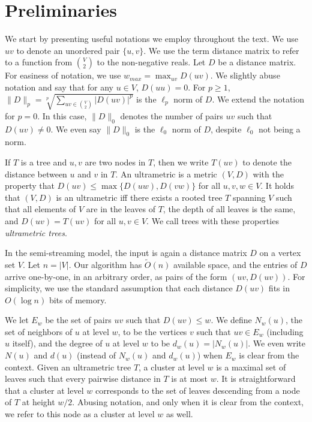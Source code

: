 \documentclass{article}
\newcommand{\set}[1]{\{#1\}}
\begin{document}
\newcommand{\clusters}{\mathcal{C}}
\newcommand{\inputmatrix}{D}

\section{Preliminaries}
We start by presenting useful notations we employ throughout the text.
We use $uv$ to denote an unordered pair $\set{u,v}$.
We use the term distance matrix to refer to a function from $\binom{V}{2}$ to the non-negative reals.
Let $D$ be a distance matrix.
For easiness of notation, we use $w_{max} = \max_{uv}{D(uv)}$.
We slightly abuse notation and say that for any $u\in V$, $D(uu)=0$.
For $p \ge 1$, $\|D\|_p = \sqrt[p]{\sum_{uv \in \binom{V}{2}}|D(uv)|^p}$ is the $\ell_p$ norm of $D$.
We extend the notation for $p=0$.
In this case, $\|D\|_0$ denotes the number of pairs $uv$ such that $D(uv)\ne 0$.
We even say $\|D\|_0$ is the $\ell_0$ norm of $D$, despite $\ell_0$ not being a norm.

If $T$ is a tree and $u,v$ are two nodes in $T$, then we write $T(uv)$ to denote the distance between $u$ and $v$ in $T$.
An ultrametric is a metric $(V,D)$ with the property that $D(uv) \le \max\set{D(uw),D(vw)}$ for all $u,v,w\in V$.
It holds that $(V,D)$ is an ultrametric iff there exists a rooted tree $T$ spanning $V$ such that all elements of $V$ are in the leaves of $T$, the depth of all leaves is the same, and $D(uv)=T(uv)$ for all $u,v\in V$.
We call trees with these properties \emph{ultrametric trees}.

In the semi-streaming model, the input is again a distance matrix $D$ on a vertex set $V$.
Let $n=|V|$.
Our algorithm has $\widetilde{O}(n)$ available space, and the entries of $D$ arrive one-by-one, in an arbitrary order, as pairs of the form $(uv,D(uv))$.
For simplicity, we use the standard assumption that each distance $D(uv)$ fits in $O(\log{n})$ bits of memory.

We let $E_w$ be the set of pairs $uv$ such that $D(uv) \le w$. 
We define $N_w(u)$, the set of neighbors of $u$ at level $w$, to be the vertices $v$ such that $uv \in E_w$ (including $u$ itself), and the degree of $u$ at level $w$ to be $d_w(u) = |N_w(u)|$.
We even write $N(u)$ and $d(u)$ (instead of $N_w(u)$ and $d_w(u)$) when $E_w$ is clear from the context.
Given an ultrametric tree $T$, a cluster at level $w$ is a maximal set of leaves such that every pairwise distance in $T$ is at most $w$.
It is straightforward that a cluster at level $w$ corresponds to the set of leaves descending from a node of $T$ at height $w/2$.
Abusing notation, and only when it is clear from the context, we refer to this node as a cluster at level $w$ as well.
\end{document}
